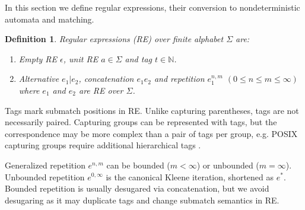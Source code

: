 \documentclass[]{article}
\newtheorem{definition}{Definition}
\newcommand{\YN}{\mathbb{N}}
\begin{document}

In this section we define regular expressions, their conversion to nondeterministic automata and matching.

\begin{definition}
Regular expressions (RE) over finite alphabet $\Sigma$ are:
\begin{enumerate}
    \item
      Empty RE $\epsilon$,
      unit RE $a \in \Sigma$
      and tag $t \in \YN$.
    \item Alternative $e_1 | e_2$,
      concatenation $e_1 e_2$ and
      repetition $e_1^{n, m}$ $(0 \!\leq\! n \!\leq\! m \!\leq\! \infty)$
      where $e_1$ and $e_2$ are RE over $\Sigma$.
\end{enumerate}
\end{definition}

Tags mark submatch positions in RE.
Unlike capturing parentheses, tags are not necessarily paired.
Capturing groups can be represented with tags,
but the correspondence may be more complex than a pair of tags per group,
e.g. POSIX capturing groups require additional hierarchical tags \cite{BorTro19}.
\medskip

Generalized repetition $e^{n, m}$ can be bounded ($m < \infty$) or unbounded ($m = \infty$).
Unbounded repetition $e^{0,\infty}$ is the canonical Kleene iteration, shortened as $e^*$.
Bounded repetition is usually desugared via concatenation,
but we avoid desugaring as it may duplicate tags and change submatch semantics in RE.
\end{document}
